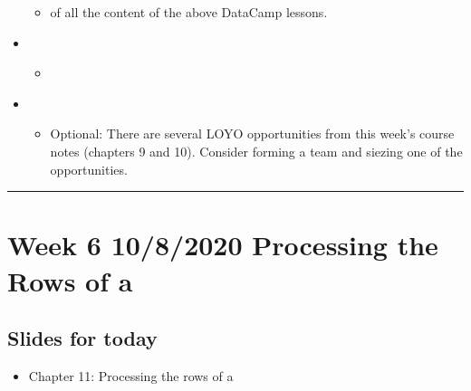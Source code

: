 \documentclass[letterpaper,10pt,english]{sphinxmanual}
\begin{document}
\begin{itemize}
\begin{itemize}
\item {} 
 of all the content of the above DataCamp lessons.

\end{itemize}

\item {} 
\begin{itemize}
\item {} 
{\hyperref[\detokenize{chapter-11-processing-rows::doc}]{}}

\end{itemize}

\item {} 
\begin{itemize}
\item {} 
Optional: There are several LOYO opportunities from this week’s course notes (chapters 9 and 10).  Consider forming a team and siezing one of the opportunities.

\end{itemize}

\end{itemize}


\bigskip\hrule\bigskip



\section{Week 6 \sphinxhyphen{} 10/8/2020 \sphinxhyphen{} Processing the Rows of a }
\label{\detokenize{course-schedule:week-6-10-8-2020-processing-the-rows-of-a-dataframe}}

\subsection{Slides for today}
\label{\detokenize{course-schedule:id9}}\begin{itemize}
\item {} 
Chapter 11: Processing the rows of a 

\end{itemize}
\end{document}
